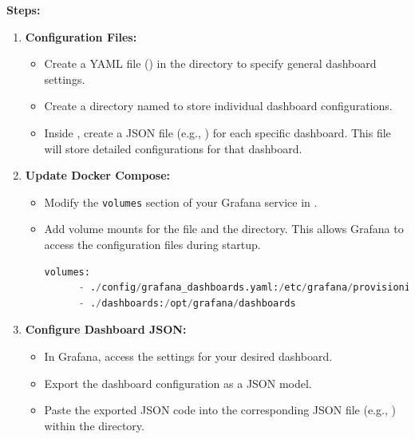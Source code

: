 \documentclass[letterpaper,12pt,notitlepage,twoside]{report}
\begin{document}
\textbf{Steps:}
\begin{enumerate}
\item \textbf{Configuration Files:}
	\begin{itemize}[noitemsep, topsep=0pt]
   	\item Create a YAML file () in the \textbf{} directory to specify general dashboard settings.
   	\item Create a directory named \textbf{} to store individual dashboard configurations.
     	\item Inside \textbf{}, create a JSON file (e.g., ) for each specific dashboard. This file will store detailed configurations for that dashboard.
	\end{itemize}
\item \textbf{Update Docker Compose:}
	\begin{itemize}[noitemsep, topsep=0pt]
   	\item Modify the \texttt{volumes} section of your Grafana service in .
   	\item Add volume mounts for the  file and the \textbf{} directory. This allows Grafana to access the configuration files during startup.
\begin{lstlisting}[language=python, numbers=none]
    volumes:
      - ./config/grafana_dashboards.yaml:/etc/grafana/provisioning/dashboards/dashboards.yaml:ro
      - ./dashboards:/opt/grafana/dashboards
\end{lstlisting}
	\end{itemize}
\item \textbf{Configure Dashboard JSON:}
	\begin{itemize}[noitemsep, topsep=0pt]
   	\item In Grafana, access the settings for your desired dashboard.
   	\item Export the dashboard configuration as a JSON model.
   	\item Paste the exported JSON code into the corresponding JSON file (e.g., ) within the \textbf{} directory.
	\end{itemize}
\end{enumerate}
\end{document}
